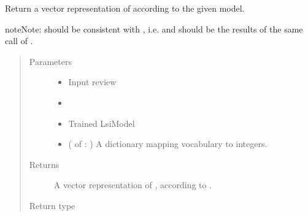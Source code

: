 \documentclass[letterpaper,10pt,english]{sphinxmanual}
\begin{document}
\begin{fulllineitems}
\label{\detokenize{learning:loacore.learning.lsi.review_2_vec}}
Return a vector representation of  according to the given model.

\begin{sphinxadmonition}{note}{Note:}
 should be consistent with , i.e.  and  should be the results of
the same call of {\hyperref[\detokenize{learning:loacore.learning.lsi.lsi_model}]{}}.
\end{sphinxadmonition}
\begin{quote}\begin{description}
\item[{Parameters}] \leavevmode\begin{itemize}
\item {} 
 \textendash{} Input review

\item {} 
 \textendash{} {\hyperref[\detokenize{classes:loacore.classes.classes.Review}]{}}

\item {} 
 \textendash{} Trained LsiModel

\item {} 
 ( of  : ) \textendash{} A dictionary mapping vocabulary to integers.

\end{itemize}

\item[{Returns}] \leavevmode
A vector representation of , according to .

\item[{Return type}] \leavevmode



\end{description}\end{quote}

\end{fulllineitems}
\end{document}
